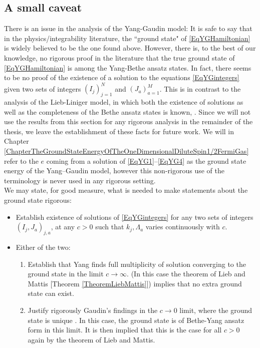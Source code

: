 \subsection{A small caveat}\label{SubsectionYGCaveat}
There is an issue in the analysis of the Yang-Gaudin model: It is safe to say that in the physics/integrability literature, the ``ground state" of \eqref{EqYGHamiltonian} is widely believed to be the one found above. However, there is, to the best of our knowledge, no rigorous proof in the literature that the true ground state of \eqref{EqYGHamiltonian} is among the Yang-Bethe ansatz states. In fact, there seems to be no proof of the existence of a solution to the equations \eqref{EqYGintegers} given two sets of integers $ (I_j)_{j=1}^{N} $ and $ (J_a)_{a=1}^{M} $. This is in contrast to the analysis of the Lieb-Liniger model, in which both the existence of solutions as well as the completeness of the Bethe ansatz states is known, \cite{cmp/1104252974}. Since we will not use the results from this section for any rigorous analysis in the remainder of the thesis, we leave the establishment of these facts for future work. We will in Chapter \ref{ChapterTheGroundStateEnergyOfTheOneDimensionalDiluteSpin1/2FermiGas} refer to the $ e $ coming from a solution of \eqref{EqYG1}--\eqref{EqYG4} as the ground state energy of the Yang--Gaudin model, however this non-rigorous use of the terminology is never used in any rigorous setting.\\
We may state, for good measure, what is needed to make statements about the ground state rigorous:
\begin{itemize}
	\item Establish existence of solutions of \eqref{EqYGintegers} for any two sets of integers $ (I_j,J_a)_{j,a} $, at any $ c>0 $ such that $ k_j,\Lambda_a $ varies continuously with $ c $.
	\item Either of the two: \begin{enumerate}
		\item Establish that Yang finds full multiplicity of solution converging to the ground state in the limit $ c\to\infty $. (In this case the theorem of Lieb and Mattis [Theorem \ref{TheoremLiebMattis}]) implies that no extra ground state can exist.
		\item Justify rigorously Gaudin's findings in the $ c\to 0 $ limit, where the ground state is unique \cite{gaudin1967systeme}. In this case, the ground state is of Bethe-Yang ansatz form in this limit. It is then implied that this is the case for all $ c>0 $ again by the theorem of Lieb and Mattis.
	\end{enumerate}
\end{itemize}










